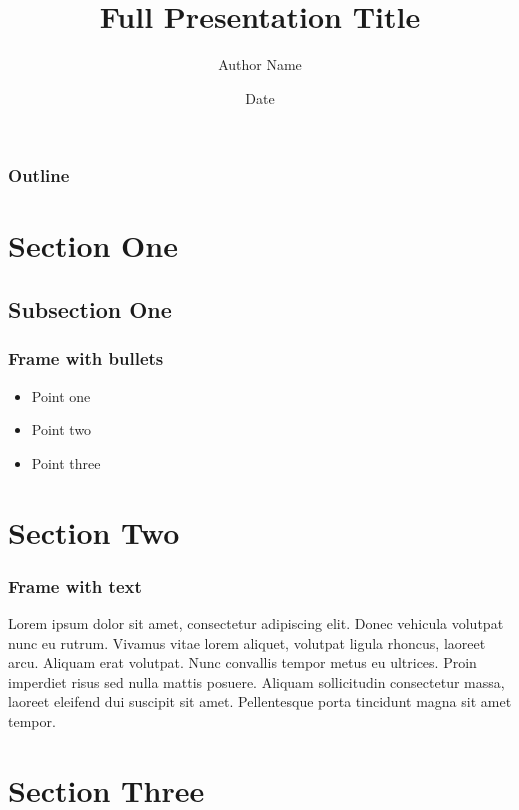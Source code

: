 \documentclass{beamer}
\title[Short Title]{Full Presentation Title}
\author{Author Name}
\institute[Institution Short Name]{Full Institution Name}
\date{Date}
\begin{document}
\begin{frame}
    \titlepage
\end{frame}

\begin{frame}
    \frametitle{Outline}
    \tableofcontents
\end{frame}

\section{Section One}
\sectionframe{}

\subsection{Subsection One}
\begin{frame}
    \frametitle{Frame with bullets}
    \begin{itemize}[<+-|alert@+>]
        \item Point one
        \item Point two
        \item Point three
    \end{itemize}
\end{frame}

\section{Section Two}
\sectionframe{}

\begin{frame}
    \frametitle{Frame with text}
    Lorem ipsum dolor sit amet, consectetur adipiscing elit. Donec vehicula volutpat nunc eu rutrum. Vivamus vitae lorem aliquet, volutpat ligula rhoncus, laoreet arcu. Aliquam erat volutpat. Nunc convallis tempor metus eu ultrices. Proin imperdiet risus sed nulla mattis posuere. Aliquam sollicitudin consectetur massa, laoreet eleifend dui suscipit sit amet. Pellentesque porta tincidunt magna sit amet tempor.
\end{frame}

\section{Section Three}
\sectionframe{}
\end{document}
